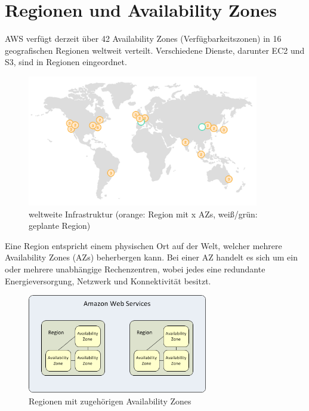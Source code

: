\section{Regionen und Availability Zones}
\label{sec:regions}
AWS verfügt derzeit über 42 Availability Zones (Verfügbarkeitszonen) in 16 geografischen Regionen weltweit verteilt. Verschiedene Dienste, darunter EC2 und S3, sind in Regionen eingeordnet.

\begin{figure}[!ht]
  \centering
  \includegraphics[width=0.9\textwidth]{images/regions.png}
  \caption{weltweite Infrastruktur (orange: Region mit x AZs, weiß/grün: geplante Region) \cite{aws:regions}}
\end{figure}

Eine Region entspricht einem physischen Ort auf der Welt, welcher mehrere Availability Zones (AZs) beherbergen kann. Bei einer AZ handelt es sich um ein oder mehrere unabhängige Rechenzentren, wobei jedes eine redundante Energieversorgung, Netzwerk und Konnektivität besitzt.

\begin{figure}[!ht]
  \centering
  \includegraphics[width=0.7\textwidth]{images/azs_regions.png}
  \caption{Regionen mit zugehörigen Availability Zones \cite{aws:azs}}\label{figure:azs-regions}
\end{figure}

